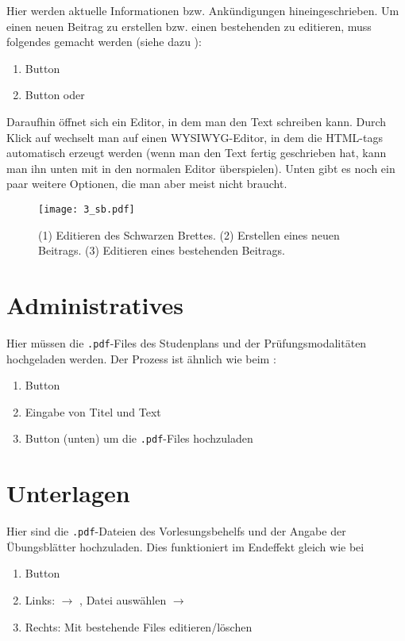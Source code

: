 Hier werden aktuelle Informationen bzw. Ankündigungen hineingeschrieben. Um
einen neuen Beitrag zu erstellen bzw. einen bestehenden zu editieren, muss
folgendes gemacht werden (siehe dazu ):
\begin{enumerate}
\item Button 
\item Button  oder 
\end{enumerate}

Daraufhin öffnet sich ein Editor, in dem man den Text schreiben kann. Durch
Klick auf  wechselt man auf einen WYSIWYG\footnotemark[1]
-Editor, in dem die HTML-tags automatisch erzeugt werden (wenn man den Text
fertig geschrieben hat, kann man ihn unten mit  in den
normalen Editor überspielen). Unten gibt es noch ein paar weitere Optionen,
die man aber meist nicht braucht.


\begin{figure}[htbp]
  \texttt{[image: 3\_sb.pdf]}
  \caption{ (1) Editieren des Schwarzen Brettes. (2) Erstellen eines neuen
    Beitrags. (3) Editieren eines bestehenden Beitrags.}
  \label{fig:sb}
\end{figure}

\section{Administratives}

Hier müssen die {\tt .pdf}-Files des Studenplans und der Prüfungsmodalitäten
hochgeladen werden. Der Prozess ist ähnlich wie beim :
\begin{enumerate}
\item Button 
\item Eingabe von Titel und Text
\item Button  (unten) um die {\tt .pdf}-Files hochzuladen
\end{enumerate}


\section{Unterlagen}

Hier sind die {\tt .pdf}-Dateien des Vorlesungsbehelfs und der Angabe der
Übungsblätter hochzuladen. Dies funktioniert im Endeffekt gleich wie bei
\begin{enumerate}
\item Button 
\item Links:  $\to$ , Datei auswählen
  $\to$ 
\item Rechts: Mit  bestehende Files editieren/löschen
\end{enumerate}


